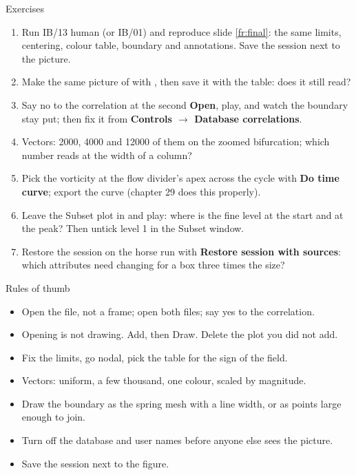 \documentclass[aspectratio=169,11pt]{beamer}
\newcommand{\gui}[1]{\textsf{\textbf{#1}}}
\begin{document}
\begin{frame}{Exercises}
\label{fr:exercises}
\footnotesize
\begin{enumerate}
  \item Run IB/13 human (or IB/01) and reproduce slide \ref{fr:final}: the same limits, centering, colour table, boundary and annotations. Save the session next to the picture.
  \item Make the same picture of  with , then save it with the  table: does it still read?
  \item Say no to the correlation at the second \gui{Open}, play, and watch the boundary stay put; then fix it from \gui{Controls $\to$ Database correlations}.
  \item Vectors: 2000, 4000 and 12000 of them on the zoomed bifurcation; which number reads at the width of a column?
  \item Pick the vorticity at the flow divider's apex across the cycle with \gui{Do time curve}; export the curve (chapter 29 does this properly).
  \item Leave the  Subset plot in and play: where is the fine level at the start and at the peak? Then untick level 1 in the Subset window.
  \item Restore the session on the horse run with \gui{Restore session with sources}: which attributes need changing for a box three times the size?
\end{enumerate}
\end{frame}

\begin{frame}{Rules of thumb}
\label{fr:thumb}
\small
\begin{itemize}
  \item Open the  file, not a frame; open both files; say yes to the correlation.
  \item Opening is not drawing. Add, then Draw. Delete the plot you did not add.
  \item Fix the limits, go nodal, pick the table for the sign of the field.
  \item Vectors: uniform, a few thousand, one colour, scaled by magnitude.
  \item Draw the boundary as the spring mesh with a line width, or as points large enough to join.
  \item Turn off the database and user names before anyone else sees the picture.
  \item Save the session next to the figure.
\end{itemize}
\end{frame}
\end{document}
